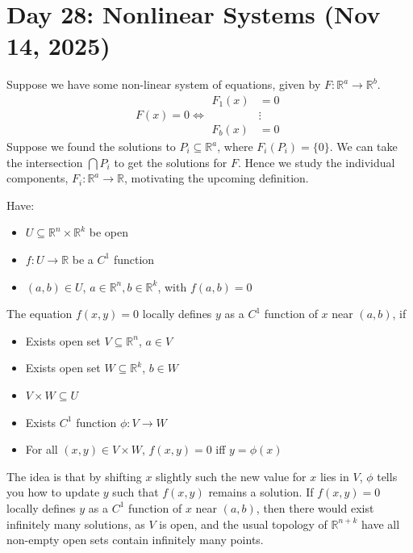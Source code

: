 \section{Day 28: Nonlinear Systems (Nov 14, 2025)}

Suppose we have some non-linear system of equations, given by $F : \mathbb{R}^a \to \mathbb{R}^b$.
\[
F(x) = 0 \iff \begin{matrix}
    F_1(x) &= 0 \\
    & \vdots \\
    F_b(x) &= 0
\end{matrix}
\]
Suppose we found the solutions to $P_i \subseteq \mathbb{R}^a$, where $F_i(P_i) = \{ 0 \}$. We can take the intersection $\bigcap P_i$ to get the solutions for $F$. Hence we study the individual components, $F_i : \mathbb{R}^a \to \mathbb{R}$, motivating the upcoming definition. \\


\begin{definition}
    Have:
    \begin{itemize}
    \item $U \subseteq \mathbb{R}^n \times \mathbb{R}^k$ be open
    \item $f : U \to \mathbb{R}$ be a $C^1$ function
        \item $(a, b) \in U$, $a \in \mathbb{R}^n, b \in \mathbb{R}^k$, with $f(a, b) = 0$
    \end{itemize}
    The equation $f(x, y) = 0$ locally defines $y$ as a $C^1$ function of $x$ near $(a, b)$, if
    \begin{itemize}
    \item Exists open set $V \subseteq \mathbb{R}^n$, $a \in V$
    \item Exists open set $W \subseteq \mathbb{R}^k$, $b \in W$
    \item $V \times W \subseteq U$
    \item Exists $C^1$ function $\phi: V \to W$ 
        \item For all $(x, y) \in V \times W$, $f(x, y) = 0$ iff $y = \phi(x)$ 
    \end{itemize}
\end{definition}

\noindent The idea is that by shifting $x$ slightly such the new value for $x$ lies in $V$, $\phi$ tells you how to update $y$ such that $f(x, y)$ remains a solution. If $f(x, y) = 0$ locally defines $y$ as a $C^1$ function of $x$ near $(a, b)$, then there would exist infinitely many solutions, as $V$ is open, and the usual topology of $\mathbb{R}^{n + k}$ have all non-empty open sets contain infinitely many points.

